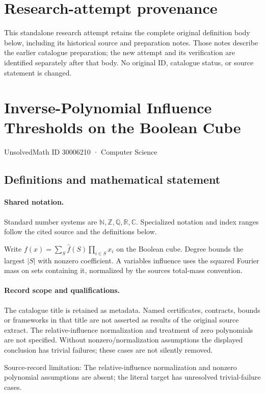 \documentclass[11pt]{article}
\begin{document}
\section*{Research-attempt provenance}
This standalone research attempt retains the complete original definition body below,
including its historical source and preparation notes. Those notes describe the
earlier catalogue preparation; the new attempt and its verification are identified
separately after that body. No original ID, catalogue status, or source statement is changed.

\section{Inverse-Polynomial Influence Thresholds on the Boolean Cube}\label{30006210}
{\small UnsolvedMath ID 30006210 · Computer Science}
\subsection{Definitions and mathematical statement}

\paragraph{Shared notation.}Standard number systems are $\mathbb N,\mathbb Z,\mathbb Q,\mathbb R,\mathbb C$. Specialized notation and index ranges follow the cited source and the definitions below.


Write $f(x)=\sum_S\widehat f(S)\prod_{i\in S}x_i$ on the Boolean cube. Degree bounds the largest $|S|$ with nonzero coefficient. A variable\textquotesingle s influence uses the squared Fourier mass on sets containing it, normalized by the source\textquotesingle s total-mass convention.
\paragraph{Record scope and qualifications.}
The catalogue title is retained as metadata. Named certificates, contracts, bounds or frameworks in that title are not asserted as results of the original source extract.
The relative-influence normalization and treatment of zero polynomials are not specified. Without nonzero/normalization assumptions the displayed conclusion has trivial failures; these cases are not silently removed.

Source-record limitation: The relative-influence normalization and nonzero polynomial assumptions are absent; the literal target has unresolved trivial-failure cases.
\end{document}
